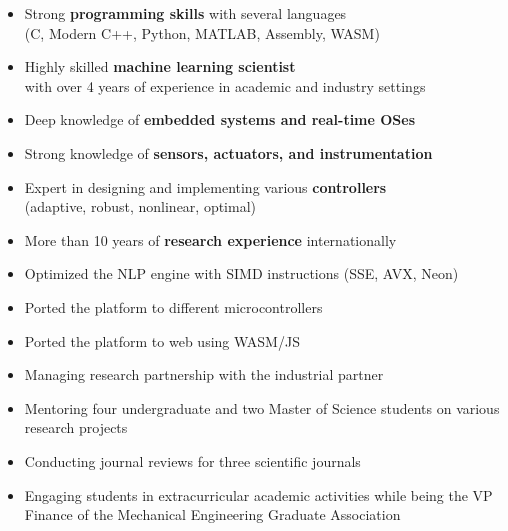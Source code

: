 \documentclass[10pt,letterpaper,ragged2e,compact]{mocv}
\begin{document}
\begin{paracol}{2}
    \begin{itemize}
        \item Strong \textbf{programming skills} with several languages \\
            (C, Modern C++, Python, MATLAB, Assembly, WASM)
        \item Highly skilled \textbf{machine learning scientist} \\
            with over 4 years of experience in academic and industry settings
        \item Deep knowledge of \textbf{embedded systems and real-time OSes} \\
        \item Strong knowledge of \textbf{sensors, actuators, and instrumentation}
        \item Expert in designing and implementing various \textbf{controllers} \\
            (adaptive, robust, nonlinear, optimal)
        \item More than 10 years of \textbf{research experience} internationally
    \end{itemize}
    \begin{itemize}
        \item Optimized the NLP engine with SIMD instructions (SSE, AVX, Neon)
        \item Ported the platform to different microcontrollers
        \item Ported the platform to web using WASM/JS
    \end{itemize}
    \divider
    \begin{itemize}
        \item Managing research partnership with the industrial partner %
        \item Mentoring four undergraduate and two Master of Science students on various research projects
        \item Conducting journal reviews for three scientific journals
        \item Engaging students in extracurricular academic activities while being the VP Finance of the Mechanical Engineering Graduate Association 

\end{itemize}
\end{paracol}
\end{document}
